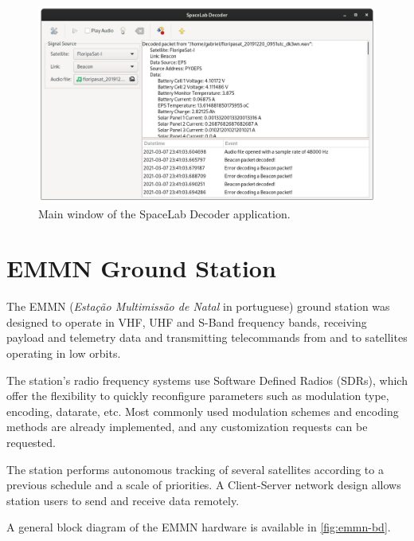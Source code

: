 \begin{figure}[!ht]
    \begin{center}
        \includegraphics[width=\textwidth]{figures/spacelab-decoder.png}
        \caption{Main window of the SpaceLab Decoder application.}
        \label{fig:spacelab-decoder}
    \end{center}
\end{figure}

\section{EMMN Ground Station}

The EMMN (\textit{Estação Multimissão de Natal} in portuguese) ground station \cite{emmn} was designed to operate in VHF, UHF and S-Band frequency bands, receiving payload and telemetry data and transmitting telecommands from and to satellites operating in low orbits.

The station's radio frequency systems use Software Defined Radios (SDRs), which offer the flexibility to quickly reconfigure parameters such as modulation type, encoding, datarate, etc. Most commonly used modulation schemes and encoding methods are already implemented, and any customization requests can be requested.

The station performs autonomous tracking of several satellites according to a previous schedule and a scale of priorities. A Client-Server network design allows station users to send and receive data remotely.

A general block diagram of the EMMN hardware is available in \autoref{fig:emmn-bd}.

